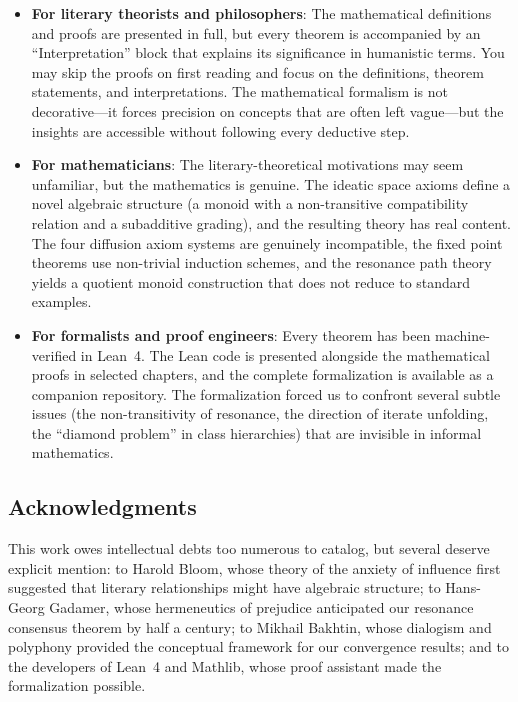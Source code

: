 \documentclass[11pt,openany]{book}
\theoremstyle{definition}
\theoremstyle{plain}
\theoremstyle{remark}
\begin{document}
\begin{itemize}
\item \textbf{For literary theorists and philosophers}: The mathematical definitions and proofs are presented in full, but every theorem is accompanied by an ``Interpretation'' block that explains its significance in humanistic terms. You may skip the proofs on first reading and focus on the definitions, theorem statements, and interpretations. The mathematical formalism is not decorative---it forces precision on concepts that are often left vague---but the insights are accessible without following every deductive step.

\item \textbf{For mathematicians}: The literary-theoretical motivations may seem unfamiliar, but the mathematics is genuine. The ideatic space axioms define a novel algebraic structure (a monoid with a non-transitive compatibility relation and a subadditive grading), and the resulting theory has real content. The four diffusion axiom systems are genuinely incompatible, the fixed point theorems use non-trivial induction schemes, and the resonance path theory yields a quotient monoid construction that does not reduce to standard examples.

\item \textbf{For formalists and proof engineers}: Every theorem has been machine-verified in Lean~4. The Lean code is presented alongside the mathematical proofs in selected chapters, and the complete formalization is available as a companion repository. The formalization forced us to confront several subtle issues (the non-transitivity of resonance, the direction of iterate unfolding, the ``diamond problem'' in class hierarchies) that are invisible in informal mathematics.
\end{itemize}

\subsection*{Acknowledgments}

This work owes intellectual debts too numerous to catalog, but several deserve explicit mention: to Harold Bloom, whose theory of the anxiety of influence first suggested that literary relationships might have algebraic structure; to Hans-Georg Gadamer, whose hermeneutics of prejudice anticipated our resonance consensus theorem by half a century; to Mikhail Bakhtin, whose dialogism and polyphony provided the conceptual framework for our convergence results; and to the developers of Lean~4 and Mathlib, whose proof assistant made the formalization possible.
\end{document}
